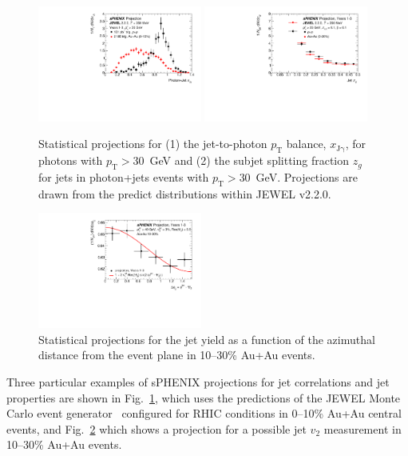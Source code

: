 \begin{figure}[h]
\centering
\includegraphics[width=0.48\textwidth]{figs/xJg_1.pdf}
\includegraphics[width=0.48\textwidth]{figs/zg_1.pdf}
\caption{Statistical projections for (1) the jet-to-photon $p_\mathrm{T}$ balance, $x_\mathrm{J\gamma}$, for photons with $p_\mathrm{T} > 30$~GeV and (2) the subjet splitting fraction $z_g$ for jets in photon+jets events with $p_\mathrm{T} > 30$~GeV. Projections are drawn from the predict distributions within JEWEL v2.2.0.}
\label{fig:jet_JEWEL_proj}
\end{figure}

\begin{figure}[h]
\centering
\includegraphics[width=0.48\textwidth]{figs/jet_dphi_1}
\caption{Statistical projections for the jet yield as a function of the azimuthal distance from the event plane in 10--30\% Au+Au events.}
\label{fig:jet_dphi_proj}
\end{figure}

Three particular examples of sPHENIX projections for jet correlations and jet properties are shown in Fig.~\ref{fig:jet_JEWEL_proj}, which uses the predictions of the JEWEL Monte Carlo event generator~\cite{KunnawalkamElayavalli:2016ttl} configured for RHIC conditions in 0--10\% Au+Au central events, and Fig.~\ref{fig:jet_dphi_proj} which shows a projection for a possible jet $v_2$ measurement in 10--30\% Au+Au events.

